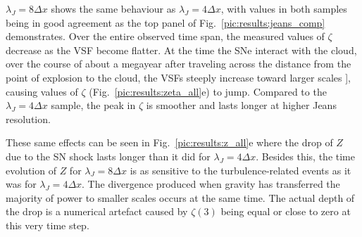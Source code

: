 $\lambda_J = 8\Delta{}x$ shows the same behaviour as $\lambda_J = 4\Delta{}x$, with values in both samples being in good agreement as the top panel of Fig.~\ref{pic:results:jeans_comp} demonstrates. 
Over the entire observed time span, the measured values of $\zeta$ decrease as the VSF become flatter.
At the time the SNe interact with the cloud,
     over the course of about a megayear after traveling across the distance from the point of   
     explosion to the cloud, 
the VSFs steeply increase 
      toward
larger scales 
    \mm{\bf [but this seems to contradict Fig1 that shows shallower slopes after impact by SNe}], 
causing values of $\zeta$ (Fig.~\ref{pic:results:zeta_all}e)
    to jump.
Compared to the $\lambda_J = 4\Delta{}x$ sample, the peak in $\zeta$ is smoother and lasts longer 
    at higher Jeans resolution.

     These same effects can be seen in Fig.~\ref{pic:results:z_all}e where the drop of $Z$ due to the SN shock lasts longer than it 
     did for
$\lambda_J = 4\Delta{}x$. 
Besides this, the time evolution of $Z$ for $\lambda_J = 8\Delta{}x$ is as sensitive to the turbulence-related events as it was for $\lambda_J = 4\Delta{}x$.
The divergence produced when gravity has transferred the majority of power to smaller scales occurs at the same time. 
    The actual
depth of the drop is a numerical artefact caused by $\zeta(3)$ being equal or close to zero at this very time step. 

